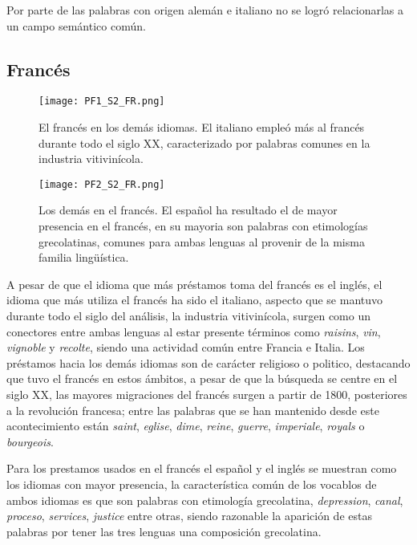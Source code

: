 Por parte de las palabras con origen alemán e italiano no se logró relacionarlas a un campo semántico común. 


\subsection{Francés} %

\begin{figure}[h!]
	\centering
	\texttt{[image: PF1\_S2\_FR.png]}
	\label{fig.ST_a_FR}
	\caption{El francés en los demás idiomas. El italiano empleó más al francés durante todo el siglo XX, caracterizado por palabras comunes en la industria vitivinícola.}
\end{figure}


\begin{figure}[h!]
	\centering
	\texttt{[image: PF2\_S2\_FR.png]}
	\label{fig.ST_b_FR}
	\caption{Los demás en el francés. El español ha resultado el de mayor presencia en el francés, en su mayoria son palabras con etimologías grecolatinas, comunes para ambas lenguas al provenir de la misma familia lingüística.}
\end{figure}
		


A pesar de que el idioma que más préstamos toma del francés es el inglés,  el idioma que más utiliza el francés ha sido el italiano,  aspecto que se mantuvo durante todo el siglo del análisis,  la industria vitivinícola, surgen como un conectores entre ambas lenguas al estar presente términos como  \textit{raisins}, \textit{vin}, \textit{vignoble} y \textit{recolte},  siendo una actividad común entre Francia e Italia.  Los préstamos hacia los demás idiomas son de carácter religioso o politico, destacando que tuvo el francés en estos ámbitos, a pesar de que la búsqueda se centre en el siglo XX, las mayores migraciones del francés surgen a partir de 1800, posteriores a la revolución francesa; entre las palabras que se han mantenido desde este acontecimiento están  \textit{saint}, \textit{eglise}, \textit{dime}, \textit{reine}, \textit{guerre}, \textit{imperiale}, \textit{royals} o \textit{bourgeois}.  


Para los prestamos usados en el francés el español y el inglés se muestran como los idiomas con mayor presencia, la característica común de los vocablos de ambos idiomas es que son palabras con etimología grecolatina, 
\textit{depression}, \textit{canal}, \textit{proceso}, \textit{services}, \textit{justice} entre otras,  siendo razonable la aparición de estas palabras por tener las tres lenguas una composición grecolatina. 


